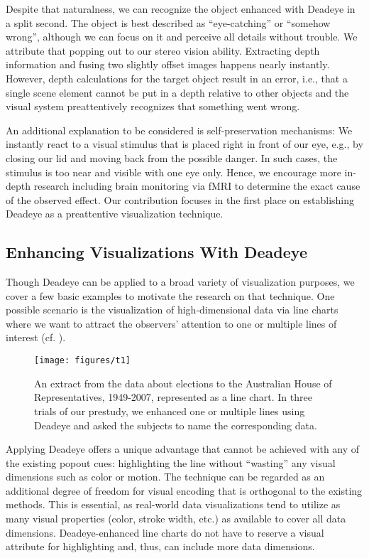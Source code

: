 \documentclass[journal]{vgtc}                %
\begin{document}
Despite that naturalness, we can recognize the object enhanced with Deadeye in a split second. The object is best described as ``eye-catching'' or ``somehow wrong'', although we can focus on it and perceive all details without trouble. We attribute that popping out to our stereo vision ability. Extracting depth information and fusing two slightly offset images happens nearly instantly. However, depth calculations for the target object result in an error, i.e., that a single scene element cannot be put in a depth relative to other objects and the visual system preattentively recognizes that something went wrong.

An additional explanation to be considered is self-preservation mechanisms: We instantly react to a visual stimulus that is placed right in front of our eye, e.g., by closing our lid and moving back from the possible danger. In such cases, the stimulus is too near and visible with one eye only. Hence, we encourage more in-depth research including brain monitoring via fMRI to determine the exact cause of the observed effect. Our contribution focuses in the first place on establishing Deadeye as a preattentive visualization technique.




\subsection{Enhancing Visualizations With Deadeye}

Though Deadeye can be applied to a broad variety of visualization purposes, we cover a few basic examples to motivate the research on that technique. One possible scenario is the visualization of high-dimensional data via line charts where we want to attract the observers' attention to one or multiple lines of interest (cf. ). 

\begin{figure}[t!]
\centering
\texttt{[image: figures/t1]}
\caption{An extract from the data about elections to the Australian House of Representatives, 1949-2007, represented as a line chart. In three trials of our prestudy, we enhanced one or multiple lines using Deadeye and asked the subjects to name the corresponding data.}
\label{fig:linechart}
\end{figure}

Applying Deadeye offers a unique advantage that cannot be achieved with any of the existing popout cues: highlighting the line without ``wasting'' any visual dimensions such as color or motion. The technique can be regarded as an additional degree of freedom for visual encoding that is orthogonal to the existing methods. This is essential, as real-world data visualizations tend to utilize as many visual properties (color, stroke width, etc.) as available to cover all data dimensions. Deadeye-enhanced line charts do not have to reserve a visual attribute for highlighting and, thus, can include more data dimensions. 
\end{document}

